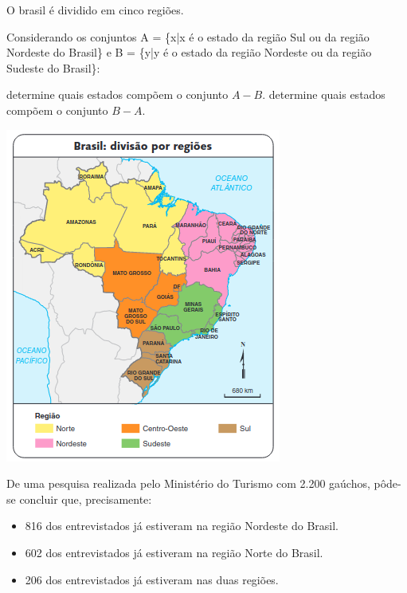 \documentclass[10pt,a4paper]{article}
\begin{document}
\begin{multicols}{2}
    \begin{question}[type=exam]
      O brasil é dividido em cinco regiões. 

      Considerando os conjuntos A = \{x|x é o estado da região Sul ou da região Nordeste do Brasil\}
      e B = \{y|y é o estado da região Nordeste ou da região Sudeste do Brasil\}:
      \begin{tasks}
        \task determine quais estados compõem o conjunto $A - B$. 
        \task determine quais estados compõem o conjunto $B - A$. 
      \end{tasks}

      \begin{Figure}
        \centering
        \includegraphics[scale=.7]{figures/q11.png}
      \end{Figure}
    \end{question}

    \begin{question}[type=exam]
      De uma pesquisa realizada pelo Ministério do Turismo com 2.200 gaúchos, pôde-se concluir que, precisamente: 

      \begin{itemize}
        \item 816 dos entrevistados já estiveram na região Nordeste do Brasil. 
        \item 602 dos entrevistados já estiveram na região Norte do Brasil. 
        \item 206 dos entrevistados já estiveram nas duas regiões. 
      \end{itemize}


\end{question}
\end{multicols}
\end{document}
